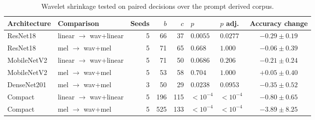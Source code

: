 \begin{table}[tbp]
\caption{Wavelet shrinkage tested on paired decisions over the prompt derived corpus.}\label{tab:paired}
\small
\begin{tabular}{@{}llrrrllc@{}}
\toprule
Architecture & Comparison & Seeds & $b$ & $c$ & $p$ & $p$ adj.\ & Accuracy change \\
\midrule
ResNet18 & linear $\rightarrow$ wav+linear & 5 & 66 & 37 & $0.0055$ & $0.0277$ & $-0.29 \pm 0.19$ \\
ResNet18 & mel $\rightarrow$ wav+mel & 5 & 71 & 65 & $0.668$ & $1.000$ & $-0.06 \pm 0.39$ \\
MobileNetV2 & linear $\rightarrow$ wav+linear & 5 & 71 & 50 & $0.0686$ & $0.206$ & $-0.21 \pm 0.24$ \\
MobileNetV2 & mel $\rightarrow$ wav+mel & 5 & 53 & 58 & $0.704$ & $1.000$ & $+0.05 \pm 0.40$ \\
DenseNet201 & mel $\rightarrow$ wav+mel & 3 & 50 & 29 & $0.0238$ & $0.0953$ & $-0.35 \pm 0.52$ \\
Compact & linear $\rightarrow$ wav+linear & 5 & 196 & 115 & $<10^{-4}$ & $<10^{-4}$ & $-0.80 \pm 0.65$ \\
Compact & mel $\rightarrow$ wav+mel & 5 & 525 & 133 & $<10^{-4}$ & $<10^{-4}$ & $-3.89 \pm 8.25$ \\
\bottomrule
\end{tabular}
\end{table}

